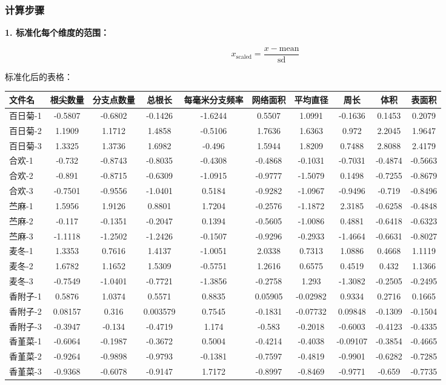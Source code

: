 \documentclass[10.5pt]{config}
\begin{document}
\subsubsection{计算步骤}

\textbf{1. 标准化每个维度的范围：}

\[
x_{\text{scaled}} = \frac{x - \text{mean}}{\text{sd}}
\]

标准化后的表格：

\begin{tabular}{l *{9}{c}}
\hline
\rowcolor{blue!20}
文件名 & 根尖数量 & 分支点数量 & 总根长 & 每毫米分支频率 & 网络面积 & 平均直径 & 周长 & 体积 & 表面积 \\
\hline
百日菊-1 & -0.5807 & -0.6802 & -0.1426 & -1.6244 & 0.5507 & 1.0991 & -0.1636 & 0.1453 & 0.2079 \\
百日菊-2 & 1.1909 & 1.1712 & 1.4858 & -0.5106 & 1.7636 & 1.6363 & 0.972 & 2.2045 & 1.9647 \\
百日菊-3 & 1.3325 & 1.3736 & 1.6982 & -0.496 & 1.5944 & 1.8209 & 0.7488 & 2.8088 & 2.4179 \\
合欢-1 & -0.732 & -0.8743 & -0.8035 & -0.4308 & -0.4868 & -0.1031 & -0.7031 & -0.4874 & -0.5663 \\
合欢-2 & -0.891 & -0.8715 & -0.6309 & -1.0915 & -0.9777 & -1.5079 & 0.1498 & -0.7255 & -0.8679 \\
合欢-3 & -0.7501 & -0.9556 & -1.0401 & 0.5184 & -0.9282 & -1.0967 & -0.9496 & -0.719 & -0.8496 \\
苎麻-1 & 1.5956 & 1.9126 & 0.8801 & 1.7204 & -0.2576 & -1.1872 & 2.3185 & -0.6258 & -0.4848 \\
苎麻-2 & -0.117 & -0.1351 & -0.2047 & 0.1394 & -0.5605 & -1.0086 & 0.4881 & -0.6418 & -0.6323 \\
苎麻-3 & -1.1118 & -1.2502 & -1.2426 & -0.1507 & -0.9296 & -0.2933 & -1.4664 & -0.6631 & -0.8027 \\
麦冬-1 & 1.3353 & 0.7616 & 1.4137 & -1.0051 & 2.0338 & 0.7313 & 1.0886 & 0.4668 & 1.1119 \\
麦冬-2 & 1.6782 & 1.1652 & 1.5309 & -0.5751 & 1.2616 & 0.6575 & 0.4519 & 0.432 & 1.1366 \\
麦冬-3 & -0.7549 & -1.0401 & -0.7721 & -1.3856 & -0.2758 & 1.293 & -1.3082 & -0.2505 & -0.2495 \\
香附子-1 & 0.5876 & 1.0374 & 0.5571 & 0.8835 & 0.05905 & -0.02982 & 0.9334 & 0.2716 & 0.1665 \\
香附子-2 & 0.08157 & 0.316 & 0.003579 & 0.7545 & -0.1831 & -0.07732 & 0.09848 & -0.1309 & -0.1504 \\
香附子-3 & -0.3947 & -0.134 & -0.4719 & 1.174 & -0.583 & -0.2018 & -0.6003 & -0.4123 & -0.4335 \\
香堇菜-1 & -0.6064 & -0.1987 & -0.3672 & 0.5004 & -0.4214 & -0.4038 & -0.09107 & -0.3854 & -0.4665 \\
香堇菜-2 & -0.9264 & -0.9898 & -0.9793 & -0.1381 & -0.7597 & -0.4819 & -0.9901 & -0.6282 & -0.7285 \\
香堇菜-3 & -0.9368 & -0.6078 & -0.9147 & 1.7172 & -0.8997 & -0.8469 & -0.9771 & -0.659 & -0.7735 \\
\hline
\end{tabular}
\end{document}

